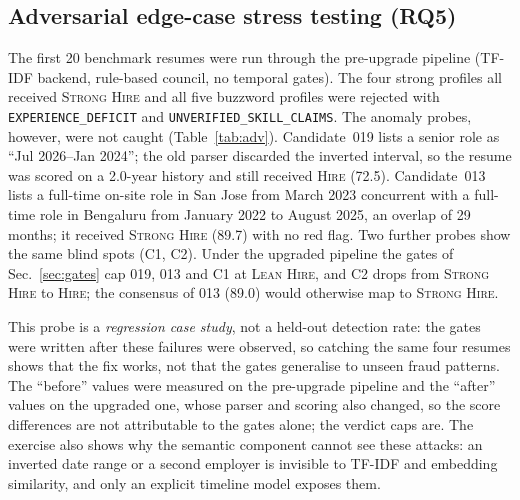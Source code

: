 \documentclass[conference]{IEEEtran}
\newcommand{\verd}[1]{\textsc{#1}}
\newcommand{\flag}[1]{\texttt{\footnotesize #1}}
\newcommand{\Sstrong}{\verd{Strong Hire}}
\newcommand{\Shire}{\verd{Hire}}
\newcommand{\Slean}{\verd{Lean Hire}}
\begin{document}
\subsection{Adversarial edge-case stress testing (RQ5)}
\label{sec:adv}
The first 20 benchmark resumes were run through the pre-upgrade pipeline (TF-IDF backend, rule-based council, no temporal gates). The four strong profiles all received \Sstrong{} and all five buzzword profiles were rejected with \flag{EXPERIENCE\_DEFICIT} and \flag{UNVERIFIED\_SKILL\_CLAIMS}. The anomaly probes, however, were not caught (Table~\ref{tab:adv}). Candidate~019 lists a senior role as ``Jul 2026--Jan 2024''; the old parser discarded the inverted interval, so the resume was scored on a 2.0-year history and still received \Shire{} (72.5). Candidate~013 lists a full-time on-site role in San Jose from March 2023 concurrent with a full-time role in Bengaluru from January 2022 to August 2025, an overlap of 29 months; it received \Sstrong{} (89.7) with no red flag. Two further probes show the same blind spots (C1, C2). Under the upgraded pipeline the gates of Sec.~\ref{sec:gates} cap 019, 013 and C1 at \Slean{}, and C2 drops from \Sstrong{} to \Shire{}; the consensus of 013 (89.0) would otherwise map to \Sstrong{}.

This probe is a \emph{regression case study}, not a held-out detection rate: the gates were written after these failures were observed, so catching the same four resumes shows that the fix works, not that the gates generalise to unseen fraud patterns. The ``before'' values were measured on the pre-upgrade pipeline and the ``after'' values on the upgraded one, whose parser and scoring also changed, so the score differences are not attributable to the gates alone; the verdict caps are. The exercise also shows why the semantic component cannot see these attacks: an inverted date range or a second employer is invisible to TF-IDF and embedding similarity, and only an explicit timeline model exposes them.
\end{document}
